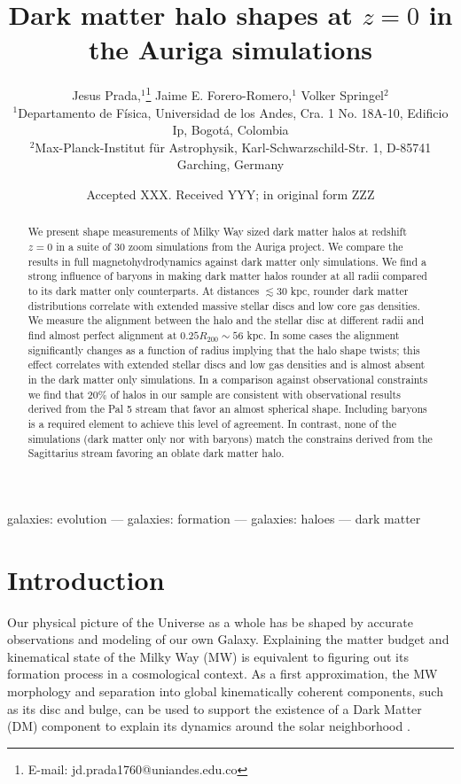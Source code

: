 \documentclass[usenatbib]{mnras}
\title[Dark matter halo shapes at $z=0$] {Dark matter halo shapes at
  $z=0$ in the Auriga simulations}
\author[Jesus Prada,  Jaime E. Forero-Romero, Volker Springel ]{
Jesus Prada,$^{1}$\thanks{E-mail: jd.prada1760@uniandes.edu.co}
Jaime E. Forero-Romero,$^{1}$
Volker Springel$^{2}$
\\
$^{1}$Departamento de F\'isica, Universidad de los Andes, Cra. 1 No.
18A-10, Edificio Ip, Bogot\'a, Colombia\\
$^{2}$Max-Planck-Institut f\"ur Astrophysik, Karl-Schwarzschild-Str. 1, D-85741 Garching, Germany\\
}
\date{Accepted XXX. Received YYY; in original form ZZZ}
\begin{document}
\label{firstpage}
\pagerange{\pageref{firstpage}--\pageref{lastpage}}
\maketitle

\begin{abstract}
We present shape measurements of Milky Way sized dark matter halos at
redshift $z=0$ in a suite of 30 zoom simulations from the Auriga
project. 
We compare the results in full magnetohydrodynamics against dark
matter only simulations. 
We find a strong influence of baryons in making dark matter halos
rounder at all radii compared to its dark matter only counterparts.
At distances $\lesssim 30$ kpc, rounder dark matter distributions
correlate with extended massive stellar discs and low core gas 
densities.  
We measure the alignment between the halo and the stellar disc at
different radii and find almost perfect alignment at
$0.25R_{200}\sim56$ kpc.    
In some cases the alignment significantly changes as a function of
radius implying that the halo shape twists; 
this effect correlates with extended stellar discs and
low gas densities and is almost absent in the dark matter only
simulations.  
In a comparison against observational constraints we find that $20\%$
of halos in our sample are consistent with observational results derived
from the Pal 5 stream that favor an almost spherical shape.
Including baryons is a required element to achieve this
level of agreement. In contrast, none of the simulations (dark matter
only nor with baryons) match the constrains derived from the
Sagittarius stream favoring an oblate dark matter halo.
\end{abstract}

\begin{keywords}
galaxies: evolution --- galaxies: formation --- galaxies: haloes ---
dark matter
\end{keywords}



\section{Introduction}

Our physical picture of the Universe as a whole has be shaped by
accurate observations and modeling of our own Galaxy. 
Explaining the matter budget and kinematical state of the Milky Way
(MW) is  equivalent to figuring out its formation process in a
cosmological context. 
As a first approximation, the MW morphology and
separation into global kinematically coherent components, such as its
disc and bulge, can be used to support the  existence of a Dark Matter
(DM) component to explain its dynamics around the solar neighborhood
\citep{2000MNRAS.311..361O,2009PASJ...61..227S,2010JCAP...08..004C,2013ApJ...779..115B,Iocco15}. 
\end{document}

